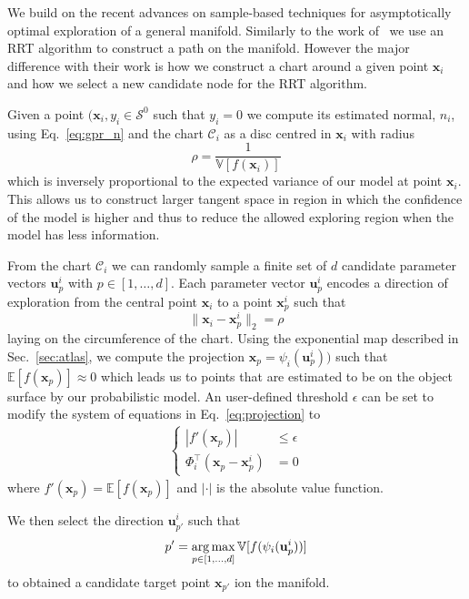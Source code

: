 We build on the recent advances on sample-based techniques for asymptotically optimal exploration of a general manifold. Similarly to the work of~\cite{Jaillet2013Path} we use an RRT algorithm to construct a path on the manifold. However the major difference with their work is how we construct a chart around a given point $\mathbf{x}_i$ and how we select a new candidate node for the RRT algorithm.

Given a point $(\mathbf{x}_i, y_i\in\mathcal{S}^0$ such that $y_i=0$ we compute its estimated normal, $n_i$, using Eq.~\ref{eq:gpr_n} and the chart $\mathcal{C}_i$ as a disc centred in $\mathbf{x}_i$ with radius
$$
\rho=\frac{1}{\mathbb{V}[f(\mathbf{x}_i)]}
$$
which is inversely proportional to the expected variance of our model at point $\mathbf{x}_i$. This allows us to construct larger tangent space in region in which the confidence of the model is higher and thus to reduce the allowed exploring region when the model has less information. 

From the chart $\mathcal{C}_i$ we can randomly sample a finite set of $d$ candidate parameter vectors $\mathbf{u}_p^i$ with $p\in[1,\dots,d]$. Each parameter vector $\mathbf{u}_p^i$ encodes a direction of exploration from the central point $\mathbf{x}_i$ to a point $\mathbf{x}_p^i$ such that
$$
\|\mathbf{x}_i-\mathbf{x}_p^i\|_2=\rho
$$
laying on the circumference of the chart. Using the exponential map described in Sec.~\ref{sec:atlas}, we compute the projection $\mathbf{x}_p=\psi_i(\mathbf{u}_p^i))$ such that $\mathbb{E}[f(\mathbf{x}_p)]\approx0$ which leads us to points that are estimated to be on the object surface by our probabilistic model. An user-defined threshold $\epsilon$ can be set to modify the system of equations in Eq.~\ref{eq:projection} to
\begin{align}
\label{eq:approxprojection}
\begin{cases}
|f'(\mathbf{x}_p)|&\leq\epsilon \\
\Phi_i^\top(\mathbf{x}_p-\mathbf{x}_p^i)&=0
\end{cases}
\end{align}
where $f'(\mathbf{x}_p)=\mathbb{E}[f(\mathbf{x}_p)]$ and $|\cdot|$ is the absolute value function.

We then select the direction $\mathbf{u}_{p'}^i$ such that
$$
p'=\operatorname*{arg\,max}_{p\in[1,\dots,d]}{\mathbb{V}[f(\psi_i(\mathbf{u}_p^i))]}
$$
to obtained a candidate target point $\mathbf{x}_{p'}$ ion the manifold. 

